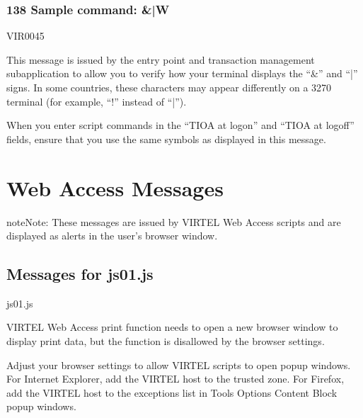 \documentclass[letterpaper,10pt,english]{sphinxmanual}
\begin{document}
\subsubsection{138 Sample command: \&|W}
\label{\detokenize{messages:sample-command-w}}\begin{description}
\sphinxAtStartPar
VIR0045

\sphinxAtStartPar
This message is issued by the entry point and transaction management sub\sphinxhyphen{}application to allow you to verify how your terminal displays the “\&” and “|” signs. In some countries, these characters may appear differently on a 3270 terminal (for example, “!” instead of “|”).

\sphinxAtStartPar
When you enter script commands in the “TIOA at logon” and “TIOA at logoff” fields, ensure that you use the same symbols as displayed in this message.

\end{description}


\section{Web Access Messages}
\label{\detokenize{messages:web-access-messages}}
\begin{sphinxadmonition}{note}{Note:}
\sphinxAtStartPar
These messages are issued by VIRTEL Web Access scripts and are displayed as alerts in the user’s browser window.
\end{sphinxadmonition}


\subsection{Messages for js01.js}
\label{\detokenize{messages:messages-for-js01-js}}
\sphinxAtStartPar
{}
\begin{description}
\sphinxAtStartPar
js01.js

\sphinxAtStartPar
VIRTEL Web Access print function needs to open a new browser window to display print data, but the function is disallowed by the browser settings.

\sphinxAtStartPar
Adjust your browser settings to allow VIRTEL scripts to open pop\sphinxhyphen{}up windows. For Internet Explorer, add the VIRTEL host to the trusted zone. For Firefox, add the VIRTEL host to the exceptions list in Tools \textendash{} Options \textendash{} Content \textendash{} Block pop\sphinxhyphen{}up windows.

\end{description}
\end{document}
